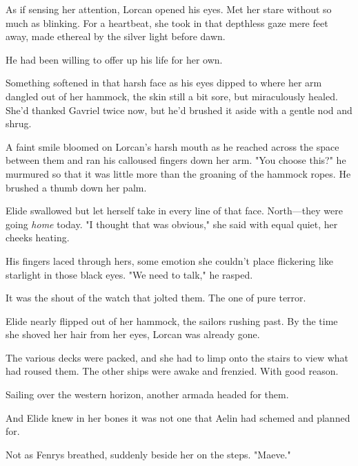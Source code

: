 As if sensing her attention, Lorcan opened his eyes.
Met her stare without so much as blinking.
For a heartbeat, she took in that depthless gaze mere feet away, made ethereal by the silver light before dawn.

He had been willing to offer up his life for her own.

Something softened in that harsh face as his eyes dipped to where her arm dangled out of her hammock, the skin still a bit sore, but 
miraculously healed.
She'd thanked Gavriel twice now, but he'd brushed it aside with a gentle nod and shrug.

A faint smile bloomed on Lorcan's harsh mouth as he reached across the space between them and ran his calloused fingers down her arm.
"You choose this?"
he murmured so that it was little more than the groaning of the hammock ropes.
He brushed a thumb down her palm.

Elide swallowed but let herself take in every line of that face.
North---they were going \emph{home} today.
"I thought that was obvious," she said with equal quiet, her cheeks heating.

His fingers laced through hers, some emotion she couldn't place flickering like starlight in those black eyes.
"We need to talk," he rasped.

It was the shout of the watch that jolted them.
The one of pure terror.

Elide nearly flipped out of her hammock, the sailors rushing past.
By the time she shoved her hair from her eyes, Lorcan was already gone.

The various decks were packed, and she had to limp onto the stairs to view what had roused them.
The other ships were awake and frenzied.
With good reason.

Sailing over the western horizon, another armada headed for them.

And Elide knew in her bones it was not one that Aelin had schemed and planned for.

Not as Fenrys breathed, suddenly beside her on the steps.
"Maeve."
